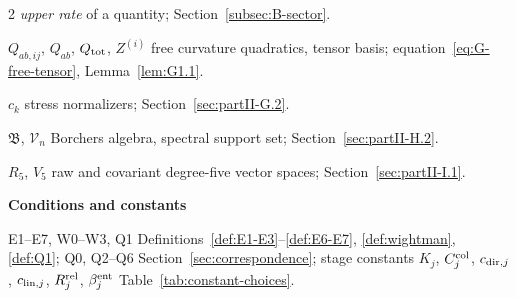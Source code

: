 \begin{multicols}{2}
\emph{upper rate} of a quantity; Section~\ref{subsec:B-sector}.

$Q_{ab,ij}$, $Q_{ab}$, $Q_{\rm tot}$, $Z^{(i)}$ free curvature quadratics, tensor basis; equation~\eqref{eq:G-free-tensor}, Lemma~\ref{lem:G1.1}.

$c_k$ stress normalizers; Section~\ref{sec:partII-G.2}.

$\mathfrak B$, $\mathcal V_n$ Borchers algebra, spectral support set; Section~\ref{sec:partII-H.2}.

$R_5$, $V_5$ raw and covariant degree-five vector spaces; Section~\ref{sec:partII-I.1}.

\medskip\textbf{Conditions and constants}\par
E1--E7, W0--W3, Q1 Definitions~\ref{def:E1-E3}--\ref{def:E6-E7}, \ref{def:wightman}, \ref{def:Q1}; Q0, Q2--Q6 Section~\ref{sec:correspondence}; stage constants $K_j$, $C^{\mathrm{col}}_{j}$, $c_{{\rm dir},j}$, $c_{{\rm lin},j}$, $R^{\rm rel}_j$, $\beta^{\rm ent}_j$ Table~\ref{tab:constant-choices}.
\end{multicols}
